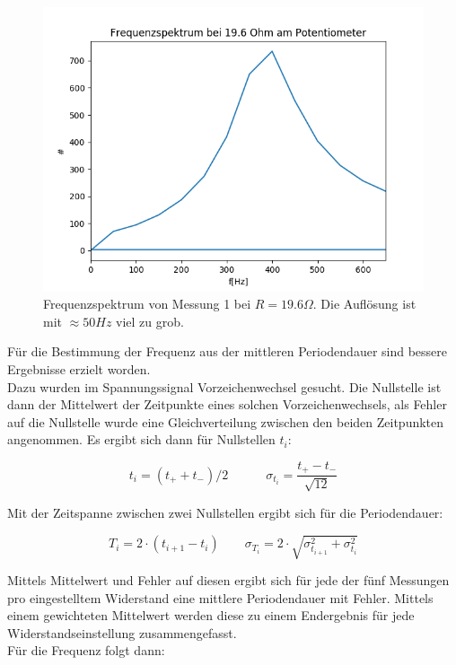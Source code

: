 \documentclass[12pt,a4paper]{article}
\begin{document}
\begin{figure}
\begin{center}
\includegraphics[scale=0.75]{Bilder/fft_19,6Ohm}
\end{center}
\caption{Frequenzspektrum von Messung 1 bei $R=19.6 \Omega$. Die Auflösung ist mit $\approx 50Hz$ viel zu grob.}
\label{fig:Fourier19,6}
\end{figure}

Für die Bestimmung der Frequenz aus der mittleren Periodendauer sind bessere Ergebnisse erzielt worden.\\
Dazu wurden im Spannungssignal Vorzeichenwechsel gesucht. Die Nullstelle ist dann der Mittelwert der Zeitpunkte eines solchen Vorzeichenwechsels, als Fehler auf die Nullstelle wurde eine Gleichverteilung zwischen den beiden Zeitpunkten angenommen. Es ergibt sich dann für Nullstellen $t_i$:

\begin{equation}
t_i=(t_++t_-)/2 \quad \quad \quad
\sigma_{t_i}=\frac{t_+-t_-}{\sqrt{12}}
\end{equation}

Mit der Zeitspanne zwischen zwei Nullstellen ergibt sich für die Periodendauer:

\begin{equation}
T_i=2\cdot (t_{i+1}-t_i) \quad \quad
\sigma_{T_i}=2\cdot \sqrt{\sigma_{t_{i+1}}^2+\sigma_{t_i}^2}
\end{equation}

Mittels Mittelwert und Fehler auf diesen ergibt sich für jede der fünf Messungen pro eingestelltem Widerstand eine mittlere Periodendauer mit Fehler. Mittels einem gewichteten Mittelwert werden diese zu einem Endergebnis für jede Widerstandseinstellung zusammengefasst.\\
Für die Frequenz folgt dann:
\end{document}
